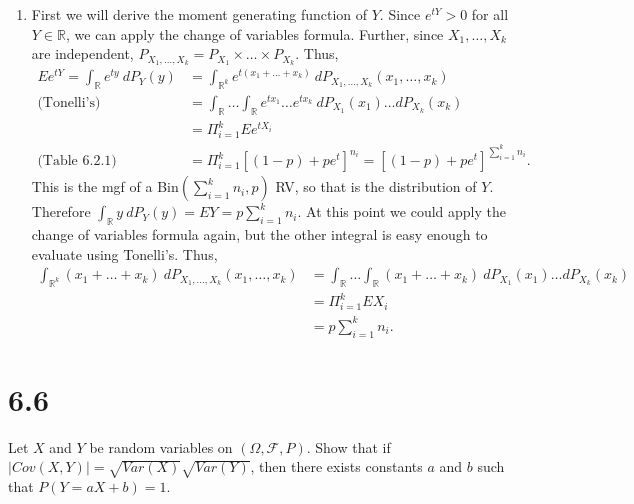 \documentclass[12pt]{article}
\begin{document}
\begin{enumerate}[label=(\alph*)]
\item 
First we will derive the moment generating function of $Y$. Since $e^{tY} > 0$ for all $Y \in \mathbb{R}$, we can apply the change of variables
formula. Further, since $X_{1}, \hdots, X_{k}$ are independent, $P_{X_{1}, \hdots, X_{k}} = P_{X_{1}}\times \dots \times P_{X_{k}}$. Thus,
\begin{align*}
Ee^{tY} = \int_{\mathbb{R}}e^{ty}\ dP_{Y}(y) & = \int_{\mathbb{R}^{k}}e^{t(x_{1} + \dots + x_{k})}\ dP_{X_{1}, \hdots, X_{k}}(x_{1}, \hdots, x_{k}) \\
\text{(Tonelli's) } & = \int_{\mathbb{R}}\dots \int_{\mathbb{R}}e^{tx_{1}}\dots e^{tx_{k}}\ dP_{X_{1}}(x_{1})\dots dP_{X_{k}}(x_{k}) \\
& = \Pi_{i=1}^{k} Ee^{tX_{i}} \\
\text{(Table 6.2.1) } & = \Pi_{i=1}^{k} [(1-p) + pe^{t}]^{n_{i}} = [(1-p) + pe^{t}]^{\sum_{i=1}^{k}n_{i}}.
\end{align*}
This is the mgf of a Bin$(\sum_{i=1}^{k}n_{i}, p)$ RV, so that is the distribution of $Y$. Therefore $\int_{\mathbb{R}}y\ dP_{Y}(y) = EY =
p\sum_{i=1}^{k}n_{i}$. At this point we could apply the change of variables formula again, but the other integral is easy enough to evaluate 
using Tonelli's. Thus,
\begin{align*}
\int_{\mathbb{R}^{k}}(x_{1} + \dots + x_{k})\ dP_{X_{1},\hdots, X_{k}}(x_{1}, \hdots, x_{k}) & = \int_{\mathbb{R}}\dots \int_{\mathbb{R}} 
(x_{1} + \dots + x_{k})\ dP_{X_{1}}(x_{1})\dots dP_{X_{k}}(x_{k}) \\
& = \Pi_{i=1}^{k}EX_{i} \\
& = p\sum_{i=1}^{k}n_{i}.
\end{align*}

\end{enumerate}






\newpage 
\section*{6.6}
Let $X$ and $Y$ be random variables on $(\Omega, \mathcal{F}, P)$. Show that if $|Cov(X,Y)| = \sqrt{Var(X)}\sqrt{Var(Y)}$, then there exists constants
$a$ and $b$ such that $P(Y = aX + b) = 1$.
\end{document}
